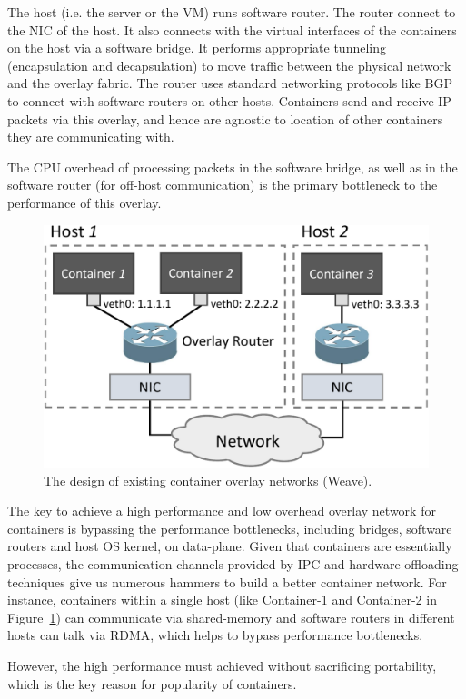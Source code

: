 The host (i.e. the server or the VM) runs software router. The router connect to
the NIC of the host. It also connects with the virtual interfaces of the
containers on the host via a software bridge. It performs appropriate tunneling
(encapsulation and decapsulation) to move traffic between the physical network
and the overlay fabric. The router uses standard networking protocols like BGP
to connect with software routers on other hosts. Containers send and receive IP
packets via this overlay, and hence are agnostic to location of other containers
they are communicating with.

The CPU overhead of processing packets in the software bridge, as well as in the
software router (for off-host communication) is the primary bottleneck to the
performance of this overlay. 

\begin{figure}  
	\centering   
	\includegraphics[width=0.8\linewidth]{figures/overlay-2.pdf}   
	\caption{\label{fig:overlay} The design of existing container overlay networks (Weave).}   
\end{figure}   

The key to achieve a high performance and low overhead overlay network for
containers is bypassing the performance bottlenecks, including bridges, software
routers and host OS kernel, on data-plane. Given that containers are essentially
processes, the communication channels provided by IPC and hardware offloading
techniques give us numerous hammers to build a better container network. For
instance, containers within a single host (like Container-1 and Container-2 in
Figure~\ref{fig:overlay}) can communicate via shared-memory and software routers
in different hosts can talk via RDMA, which helps to bypass performance
bottlenecks.

However, the high performance must achieved without sacrificing portability,
which is the key reason for popularity of containers. 

